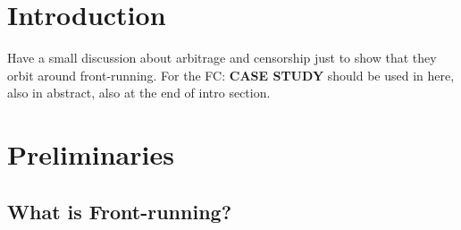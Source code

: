 
\section{Introduction}

Have a small discussion about arbitrage and censorship just to show that they orbit around front-running.
For the FC: \textbf{CASE STUDY} should be used in here, also in abstract, also at the end of intro section.
 





\section{Preliminaries}

\subsection{What is Front-running?} %
\label{sec:What is front-running?}


